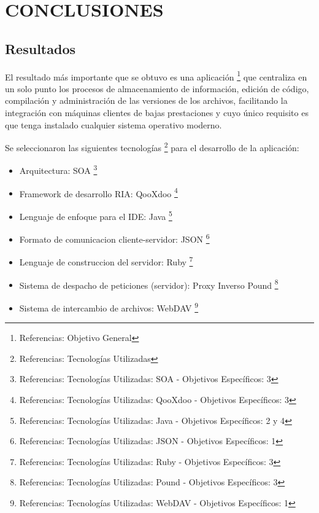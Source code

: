 \section{CONCLUSIONES}

\subsection{Resultados}

El resultado más importante que se obtuvo es una aplicación \footnote {Referencias: Objetivo General} que centraliza en un solo punto los procesos de almacenamiento de información, edición de código, compilación y administración de las versiones de los archivos, facilitando la integración con máquinas clientes de bajas prestaciones y cuyo único requisito es que tenga instalado cualquier sistema operativo moderno.

Se seleccionaron las siguientes tecnologías \footnote {Referencias: Tecnologías Utilizadas} para el desarrollo de la aplicación:

\begin{itemize}
	
	\item Arquitectura: SOA
	\footnote {Referencias: Tecnologías Utilizadas: SOA - Objetivos Específicos: 3}
	
	\item Framework de desarrollo RIA: QooXdoo
	\footnote {Referencias: Tecnologías Utilizadas: QooXdoo - Objetivos Específicos: 3}
	
	\item Lenguaje de enfoque para el IDE: Java
	\footnote {Referencias: Tecnologías Utilizadas: Java - Objetivos Específicos: 2 y 4}
	
	\item Formato de comunicacion cliente-servidor: JSON
	\footnote {Referencias: Tecnologías Utilizadas: JSON - Objetivos Específicos: 1}
	
	\item Lenguaje de construccion del servidor: Ruby
	\footnote {Referencias: Tecnologías Utilizadas: Ruby - Objetivos Específicos: 3}
	
	\item Sistema de despacho de peticiones (servidor): Proxy Inverso Pound
	\footnote {Referencias: Tecnologías Utilizadas: Pound - Objetivos Específicos: 3}
	
	\item Sistema de intercambio de archivos: WebDAV
	\footnote {Referencias: Tecnologías Utilizadas: WebDAV - Objetivos Específicos: 1}
	
\end{itemize}


